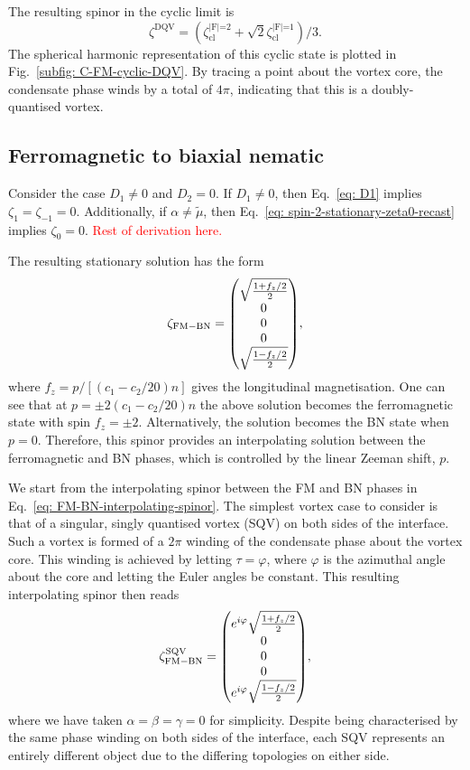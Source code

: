 The resulting spinor in the cyclic limit is
\begin{equation}\label{eq: C-FM-DQV-cyclic-limit}
    \zeta^\text{DQV}
    = \left(\zeta^\text{|F|=2}_\text{cl}
    + \sqrt{2}\zeta^\text{|F|=1}_\text{cl}\right) / 3.
\end{equation}
The spherical harmonic representation of this cyclic state is plotted in
Fig.~\ref{subfig: C-FM-cyclic-DQV}.
By tracing a point about the vortex core, the condensate phase winds by a total
of \(4\pi \), indicating that this is a doubly-quantised vortex.

\subsection{Ferromagnetic to biaxial nematic}
Consider the case \(D_1 \neq 0\) and \(D_2 = 0\).
If \(D_1 \neq 0\), then Eq.~\eqref{eq: D1} implies \(\zeta_1=\zeta_{-1} = 0\).
Additionally, if \(\alpha \neq \tilde{\mu}\),
then Eq.~\eqref{eq: spin-2-stationary-zeta0-recast} implies \(\zeta_0 = 0\).
\textcolor{red}{Rest of derivation here.}

The resulting stationary solution has the form
\begin{equation}\label{eq: FM-BN-interpolating-spinor}
    \zeta_\mathrm{FM-BN} = \mqty(\sqrt{\frac{1 + f_z/2}{2}} \\ 0 \\ 0 \\ 0 \\
    \sqrt{\frac{1 - f_z/2}{2}}),
\end{equation}
where \(f_z = p / [(c_1-c_2/20)n]\) gives the longitudinal magnetisation.
One can see that at \(p = \pm 2(c_1-c_2/20)n\) the above solution becomes
the ferromagnetic state with spin \(f_z = \pm 2\).
Alternatively, the solution becomes the BN state when \(p=0\).
Therefore, this spinor provides an interpolating solution between the
ferromagnetic and BN phases, which is controlled by the linear Zeeman shift,
\(p\).

We start from the interpolating spinor between the FM and BN phases in
Eq.~\eqref{eq: FM-BN-interpolating-spinor}.
The simplest vortex case to consider is that of a singular, singly quantised
vortex (SQV) on both sides of the interface.
Such a vortex is formed of a \(2\pi \) winding of the condensate phase about
the vortex core.
This winding is achieved by letting \(\tau = \varphi \), where \(\varphi \) is
the azimuthal angle about the core and letting the Euler angles be constant.
This resulting interpolating spinor then reads
\begin{equation}
    \zeta_\mathrm{FM-BN}^\mathrm{SQV} =
    \mqty(e^{i\varphi}\sqrt{\frac{1 + f_z/2}{2}} \\ 0 \\ 0 \\ 0 \\
    e^{i\varphi}\sqrt{\frac{1 - f_z/2}{2}}),
\end{equation}
where we have taken \(\alpha=\beta=\gamma=0\) for simplicity.
Despite being characterised by the same phase winding on both sides of the
interface, each SQV represents an entirely different object due to the
differing topologies on either side.

